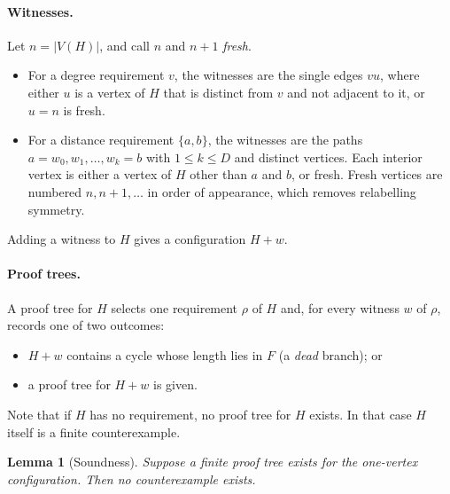 \documentclass[11pt]{article}
\newtheorem{lemma}[theorem]{Lemma}
\theoremstyle{remark}
\begin{document}
\paragraph{Witnesses.} Let $n=|V(H)|$, and call $n$ and $n+1$ \emph{fresh}.
\begin{itemize}
\item For a degree requirement $v$, the witnesses are the single edges $vu$, where either $u$ is a
  vertex of $H$ that is distinct from $v$ and not adjacent to it, or $u=n$ is fresh.
\item For a distance requirement $\{a,b\}$, the witnesses are the paths $a=w_0,w_1,\dots,w_k=b$ with
  $1\le k\le D$ and distinct vertices. Each interior vertex is either a vertex of $H$ other than $a$
  and $b$, or fresh. Fresh vertices are numbered $n,n+1,\dots$ in order of appearance, which
  removes relabelling symmetry.
\end{itemize}
Adding a witness to $H$ gives a configuration $H+w$.

\paragraph{Proof trees.} A proof tree for $H$ selects one requirement $\rho$ of $H$ and, for every
witness $w$ of $\rho$, records one of two outcomes:
\begin{itemize}
\item $H+w$ contains a cycle whose length lies in $F$ (a \emph{dead} branch); or
\item a proof tree for $H+w$ is given.
\end{itemize}
Note that if $H$ has no requirement, no proof tree for $H$ exists. In that case $H$ itself is a
finite counterexample.

\begin{lemma}[Soundness]\label{lem:sound}
Suppose a finite proof tree exists for the one-vertex configuration. Then no counterexample exists.
\end{lemma}
\end{document}
